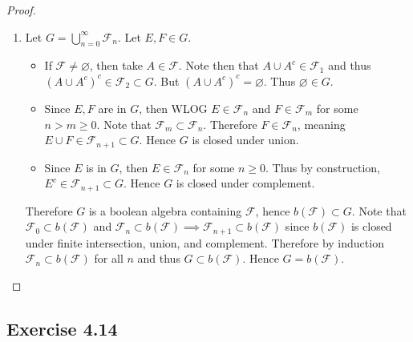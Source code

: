 \documentclass[hw_all.tex]{subfiles}
\begin{document}
\begin{proof}
\begin{enumerate}
            Consider $X = \qty{0,1}^N$ and let $F_k = \qty{x \in X : x_k = 1}$. Note that by the same construction above, $A_x = \qty{x}$ for every $x \in \qty{0,1}^N$. Since every Boolean algebra containing $\mathcal{F} = \qty{F_1, \ldots, F_N}$ must be closed under finite union, intersection, and complement it follows that every Boolean algebra contains $A_x$ for all $x \in X$. But that means every singleton of $X$ is contained in every Boolean algebra. Therefore every Boolean algebra must equal $\mathcal{P}(X)$, hence $|b(\mathcal{F})| = |\mathcal{F}| = 2^{|X|} = 2^{2^N}$.


        \item 
            Let $G = \bigcup_{n=0}^\infty \mathcal{F}_n$. Let $E, F \in G$.
            \begin{itemize}
                \item If $\mathcal{F} \neq \varnothing$, then take $A \in \mathcal{F}$. Note then that $A \cup A^c \in \mathcal{F_1}$ and thus $(A \cup A^c)^c \in \mathcal{F_2} \subset G$. But $(A\cup A^c)^c = \varnothing$. Thus $\varnothing \in G$.

                \item Since $E, F$ are in $G$, then WLOG $E \in \mathcal{F}_{n}$ and $F \in \mathcal{F}_m$ for some $n > m \geq 0$. Note that $\mathcal{F}_m \subset \mathcal{F}_n$. Therefore $F \in \mathcal{F}_n$, meaning $E \cup F \in \mathcal{F}_{n+1} \subset G$. Hence $G$ is closed under union.

                \item Since $E$ is in $G$, then $E \in \mathcal{F}_n$ for some $n \geq 0$. Thus by construction, $E^c \in \mathcal{F}_{n+1} \subset G$. Hence $G$ is closed under complement.
            \end{itemize}

            Therefore $G$ is a boolean algebra containing $\mathcal{F}$, hence $b(\mathcal{F}) \subset G$. Note that $\mathcal{F}_0 \subset b(\mathcal{F})$ and $\mathcal{F}_n \subset b(\mathcal{F}) \implies \mathcal{F}_{n+1} \subset b(\mathcal{F})$ since $b(\mathcal{F})$ is closed under finite intersection, union, and complement. Therefore by induction $\mathcal{F}_n \subset b(\mathcal{F})$ for all $n$ and thus $G \subset b(\mathcal{F})$. Hence $G = b(\mathcal{F})$.
    \end{enumerate}
\end{proof}

\subsection{Exercise 4.14}
\end{document}
